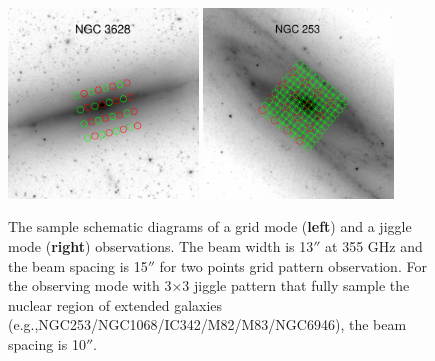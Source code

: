\documentclass[legal,11pt]{article}
\begin{document}





\begin{figure}
\centering

\includegraphics[width=0.45\textwidth]{n3628_harp_grid.eps}
\hskip10pt
\includegraphics[width=0.45\textwidth]{n253_harp_jiggle.eps}

\caption{The sample schematic diagrams of a grid mode ({\bf left}) and a jiggle
mode ({\bf right}) observations. The beam width is 13$''$ at 355 GHz and the
beam spacing is 15$''$ for two points grid pattern observation. For the
observing mode with 3$\times$3 jiggle pattern that fully sample the nuclear
region of extended galaxies (e.g.,NGC253/NGC1068/IC342/M82/M83/NGC6946), the
beam spacing is 10$''$.} \label{fig:obs}

\end{figure}
\end{document}
